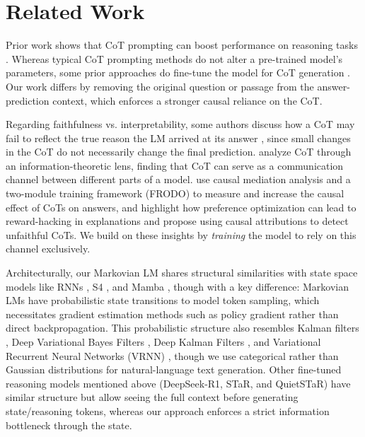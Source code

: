 \documentclass{article} %
\begin{document}
\section{Related Work}
\label{sec:related_work}

Prior work shows that CoT prompting can boost performance on reasoning tasks \citep{wei2022chain, nye2022show}.
Whereas typical CoT prompting methods do not alter a pre-trained model's parameters, some prior approaches do fine-tune the model for CoT generation \citep{eric_star2022, zelikman2024quietstar, deepseekai2025}. Our work differs by removing the original question or passage from the answer-prediction context, which enforces a stronger causal reliance on the CoT.

Regarding faithfulness vs. interpretability, some authors discuss how a CoT may fail to reflect the true reason the LM arrived at its answer \citep{lanham2023measuring, turpin2023language}, since small changes in the CoT do not necessarily change the final prediction. \citet{zhou2023understanding} analyze CoT through an information-theoretic lens, finding that CoT can serve as a communication channel between different parts of a model. \citet{paul2024makingreasoningmatter} use causal mediation analysis and a two-module training framework (FRODO) to measure and increase the causal effect of CoTs on answers, and \citet{ferreira2025truthful} highlight how preference optimization can lead to reward-hacking in explanations and propose using causal attributions to detect unfaithful CoTs. We build on these insights by \emph{training} the model to rely on this channel exclusively.

Architecturally, our Markovian LM shares structural similarities with state space models like RNNs \citep{rumelhart1986learning}, S4 \citep{gu2022efficientlymodelinglongsequences}, and Mamba \citep{gu2024mamba}, though with a key difference: Markovian LMs have probabilistic state transitions to model token sampling, which necessitates gradient estimation methods such as policy gradient \citep{policy_gradient} rather than direct backpropagation. This probabilistic structure also resembles Kalman filters \citep{proto_pomdp1965}, Deep Variational Bayes Filters \citep{karl2017deepvariationalbayesfilters}, Deep Kalman Filters \citep{krishnan2015deepkalmanfilters}, and Variational Recurrent Neural Networks (VRNN) \citep{DBLP:journals/corr/ChungKDGCB15}, though we use categorical rather than Gaussian distributions for natural-language text generation. Other fine-tuned reasoning models mentioned above (DeepSeek-R1, STaR, and QuietSTaR) have similar structure but allow seeing the full context before generating state/reasoning tokens, whereas our approach enforces a strict information bottleneck through the state.
\end{document}
